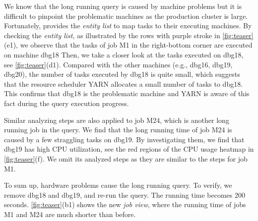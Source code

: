 We know that the long running query is caused by machine problems but it is difficult to pinpoint the problematic machines as the production cluster is large.
Fortunately, \qevis{} provides the \textit{entity list} to map tasks to their executing machines.
By checking the \textit{entity list}, as illustrated by the rows with purple stroke in \autoref{fig:teaser}(e1), 
we observe that the tasks of job M1 in the right-bottom corner are executed on machine dbg18
Then, we take a closer look at the tasks executed on dbg18, see \autoref{fig:teaser}(d1).
Compared with the other machines (e.g., dbg16, dbg19, dbg20), the number of tasks executed by dbg18 is quite small,
which suggests that the resource scheduler YARN allocates a small number of tasks to dbg18. 
This confirms that dbg18 is the problematic machine and YARN is aware of this fact during the query execution progress.

Similar analyzing steps are also applied to job M24, which is another long running job in the query. 
We find that the long running time of job M24 is caused by a few straggling tasks on dbg19.
By investigating them, we find that dbg19 has high CPU utilization, see the red regions of the CPU usage heatmap in \autoref{fig:teaser}(f). 
We omit its analyzed steps as they are similar to the steps for job M1. 

To sum up, hardware problems cause the long running query. 
To verify, we remove dbg18 and dbg19, and re-run the query. The running time becomes 200 seconds.
\autoref{fig:teaser}(b1) shows the new \textit{job view}, where the running time of jobs M1 and M24 are much shorter than before.

